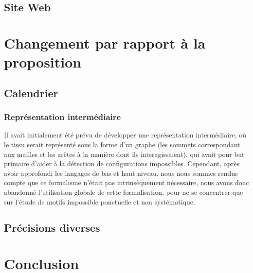 \documentclass{article}
\begin{document}
\subsection{Site Web}

\section{Changement par rapport à la proposition}

\subsection{Calendrier}

\subsubsection{Représentation intermédiaire}

Il avait initialement été prévu de développer une représentation intermédiaire, où le tissu serait représenté sous la forme d'un graphe (les sommets 
correspondant aux mailles et les arêtes à la manière dont ils interagissaient), qui avait pour but primaire d'aider à la détection de configurations 
impossibles. Cependant, après avoir approfondi les langages de bas et haut niveau, nous nous sommes rendus compte que ce formalisme n'était pas 
intrinsèquement nécessaire, nous avons donc abandonné l'utilisation globale de cette formalisation, pour ne se concentrer que sur l'étude de motifs 
impossible ponctuelle et non systématique.

\subsection{Précisions diverses}

\section*{Conclusion}
\end{document}
